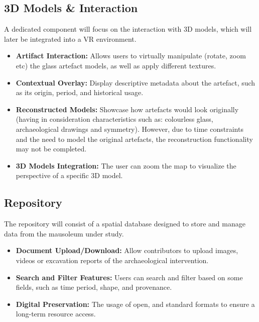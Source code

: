 \subsection*{\gls{3D} Models \& Interaction}
A dedicated component will focus on the interaction with \gls{3D} models, which will later be integrated into a \gls{VR} environment.
\begin{itemize}
    \item \textbf{Artifact Interaction:} Allows users to virtually manipulate (rotate, zoom etc) the glass artefact models, as well as apply different textures.
    \item \textbf{Contextual Overlay:} Display descriptive metadata about the artefact, such as its origin, period, and historical usage.
    \item \textbf{Reconstructed Models:} Showcase how artefacts would look originally (having in consideration characteristics such as: colourless glass, archaeological drawings and symmetry). However, due to time constraints and the need to model the original artefacts, the reconstruction functionality may not be completed.
    \item \textbf{3D Models Integration:} The user can zoom the map to visualize the perspective of a specific \gls{3D} model.
\end{itemize}

\subsection*{Repository}
The repository will consist of a spatial database designed to store and manage data from the mausoleum under study.
\begin{itemize}
    \item \textbf{Document Upload/Download:} Allow contributors to upload images, videos or excavation reports of the archaeological intervention.
    \item \textbf{Search and Filter Features:} Users can search and filter based on some fields, such as time period, shape, and provenance.
    \item \textbf{Digital Preservation:} The usage of open, and standard formats to ensure a long-term resource access.
\end{itemize}


